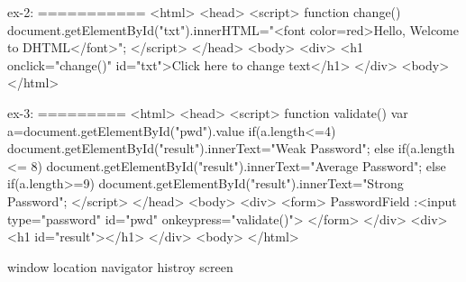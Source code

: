 ex-2:
===========
<html>
    <head>
	   <script>
	     function change()
		 {
document.getElementById("txt").innerHTML="<font color=red>Hello, Welcome to DHTML</font>";
		 }
	   </script>
	</head>
	<body>
	<div>
      <h1 onclick="change()" id="txt">Click here to change text</h1>
   </div>
  <body>
</html>

ex-3:
=========
<html>
    <head>
	   <script>
	     function validate()
		 {
			var a=document.getElementById("pwd").value
			if(a.length<=4)
			  document.getElementById("result").innerText="Weak Password";
			 else if(a.length <= 8)
			   document.getElementById("result").innerText="Average Password";
			 else if(a.length>=9)
			   document.getElementById("result").innerText="Strong Password";
		 }
	   </script>
	</head>
	<body>
	<div>
     <form>
	    PasswordField :<input type="password" id="pwd" onkeypress="validate()">
	 </form>
   </div>
   <div>
      <h1 id="result"></h1>
   </div>
  <body>
</html>

window
location
navigator
histroy
screen
